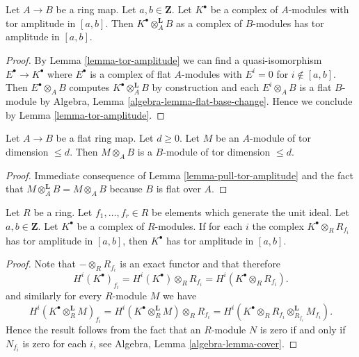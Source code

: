 \begin{lemma}
\label{lemma-pull-tor-amplitude}
Let $A \to B$ be a ring map.
Let $a, b \in \mathbf{Z}$.
Let $K^\bullet$ be a complex of $A$-modules with tor amplitude in $[a, b]$.
Then $K^\bullet \otimes_A^{\mathbf{L}} B$ as a complex of $B$-modules
has tor amplitude in $[a, b]$.
\end{lemma}

\begin{proof}
By
Lemma \ref{lemma-tor-amplitude}
we can find a quasi-isomorphism $E^\bullet \to K^\bullet$ where
$E^\bullet$ is a complex of flat $A$-modules with $E^i = 0$ for
$i \not \in [a, b]$. Then $E^\bullet \otimes_A B$ computes
$K^\bullet \otimes_A ^{\mathbf{L}} B$ by construction and
each $E^i \otimes_A B$ is a flat $B$-module by
Algebra, Lemma \ref{algebra-lemma-flat-base-change}.
Hence we conclude by
Lemma \ref{lemma-tor-amplitude}.
\end{proof}

\begin{lemma}
\label{lemma-flat-base-change-finite-tor-dimension}
Let $A \to B$ be a flat ring map. Let $d \geq 0$.
Let $M$ be an $A$-module of tor dimension $\leq d$.
Then $M \otimes_A B$ is a $B$-module of tor dimension $\leq d$.
\end{lemma}

\begin{proof}
Immediate consequence of
Lemma \ref{lemma-pull-tor-amplitude}
and the fact that $M \otimes_A^{\mathbf{L}} B = M \otimes_A B$
because $B$ is flat over $A$.
\end{proof}

\begin{lemma}
\label{lemma-glue-tor-amplitude}
Let $R$ be a ring. Let $f_1, \ldots, f_r \in R$ be elements which
generate the unit ideal. Let $a, b \in \mathbf{Z}$. Let $K^\bullet$
be a complex of $R$-modules. If for each $i$ the complex
$K^\bullet \otimes_R R_{f_i}$ has tor amplitude in $[a, b]$,
then $K^\bullet$ has tor amplitude in $[a, b]$.
\end{lemma}

\begin{proof}
Note that $- \otimes_R R_{f_i}$ is an exact functor and that therefore
$$
H^i(K^\bullet)_{f_i} =
H^i(K^\bullet) \otimes_R R_{f_i} = H^i(K^\bullet \otimes_R R_{f_i}).
$$
and similarly for every $R$-module $M$ we have
$$
H^i(K^\bullet \otimes_R^{\mathbf{L}} M)_{f_i} =
H^i(K^\bullet \otimes_R^{\mathbf{L}} M) \otimes_R R_{f_i} =
H^i(K^\bullet \otimes_R R_{f_i} \otimes_{R_{f_i}}^{\mathbf{L}} M_{f_i}).
$$
Hence the result follows from the fact that an $R$-module $N$
is zero if and only if $N_{f_i}$ is zero for each $i$, see
Algebra, Lemma \ref{algebra-lemma-cover}.
\end{proof}

